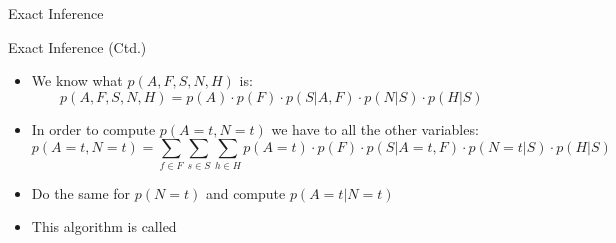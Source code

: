 \begin{frame}{Exact Inference}{}
\end{frame}


\begin{frame}{Exact Inference (Ctd.)}{}
	\begin{itemize}
		\item We know what $p(A, F, S, N, H)$ is:
		\begin{equation*}
			p(A, F, S, N, H) = p(A) \cdot p(F) \cdot p(S \vert A, F) \cdot p(N \vert S) \cdot p(H \vert S)
		\end{equation*}
		\item In order to compute $p(A = t, N = t)$ we have to  all the other variables:
		{\footnotesize
		\begin{equation*}
			p(A = t, N = t) = \sum_{f \in F} \sum_{s \in S} \sum_{h \in H}
				p(A = t) \cdot p(F) \cdot p(S \vert A = t, F) \cdot p(N = t \vert S) \cdot p(H \vert S)
		\end{equation*}}
		\item Do the same for $p(N = t)$ and compute $p(A = t \vert N = t)$
		\item This algorithm is called 
	\end{itemize}
\end{frame}


